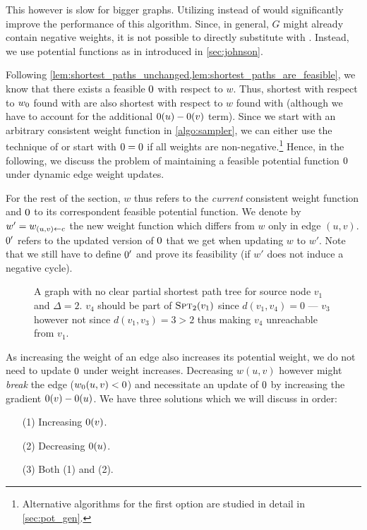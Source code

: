 This however is slow for bigger graphs.
Utilizing \algdk instead of \algbf would significantly improve the performance of this algorithm.
Since, in general, $G$ might already contain negative weights, it is not possible to directly substitute \algbf with \algdk.
Instead, we use potential functions as in \algjs introduced in \cref{sec:johnson}.

Following \cref{lem:shortest_paths_unchanged,lem:shortest_paths_are_feasible}, we know that there exists a feasible $\pot$ with respect to $w$. 
Thus, shortest  with respect to $\wpot$ found with \algdk are also shortest  with respect to $w$ found with \algbf (although we have to account for the additional $\pot(u) - \pot(v)$ term).  
Since we start with an arbitrary consistent weight function in \cref{algo:sampler}, we can either use the technique of \algjs or start with $\pot = 0$ if all weights are non-negative.\footnote{
  Alternative algorithms for the first option are studied in detail in \cref{sec:pot_gen}.
}
Hence, in the following, we discuss the problem of maintaining a feasible potential function $\pot$ under dynamic edge weight updates.

\smallskip

For the rest of the section, $w$ thus refers to the \emph{current} consistent weight function and $\pot$ to its correspondent feasible potential function.
We denote by $w' = w_{(u, v) \gets c}$ the new weight function which differs from $w$ only in edge $(u, v)$. 
$\pot'$ refers to the updated version of $\pot$ that we get when updating $w$ to $w'$.
Note that we still have to define $\pot'$ and prove its feasibility (if $w'$ does not induce a negative cycle).

\bigskip

\begin{figure}[t]
  \centering
  
  \caption{
    A graph with no clear partial shortest path tree for source node $v_1$ and $\Delta = 2$.
    $v_4$ should be part of $\textsc{Spt}_{2}(v_1)$ since $d(v_1, v_4) = 0$ --- $v_3$ however not since $d(v_1, v_3) = 3 > 2$ thus making $v_4$ unreachable from $v_1$.
  }
  \label{fig:partial_spt}
\end{figure}

As increasing the weight of an edge also increases its potential weight, we do not need to update $\pot$ under weight increases.
Decreasing $w(u, v)$ however might \emph{break} the edge ($\wpot(u, v) < 0$) and necessitate an update of $\pot$ by increasing the gradient $\pot(v) - \pot(u)$.
We have three solutions which we will discuss in order: \begin{itemize}
  \item[(1)] Increasing $\pot(v)$.
  \item[(2)] Decreasing $\pot(u)$.
  \item[(3)] Both (1) and (2).
\end{itemize}

